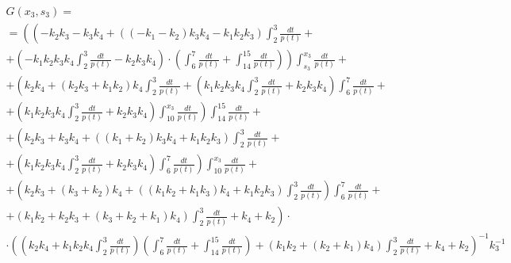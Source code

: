 \documentclass[a4paper,12pt]{article} %
\begin{document}
\begin{multline}
	G(x_3,s_3)=\\=
	\left(
		\left(
			-k_2 k_3-k_3 k_4+\left( \left( -k_1-k_2\right)  k_3 k_4-k_1 k_2 k_3\right)  \int_{2}^{3}\frac{dt}{p(t)}
			\right. \right. + \\ + \left. \left.
			\left( -k_1 k_2 k_3 k_4 \int_{2}^{3}\frac{dt}{p(t)}-k_2 k_3 k_4\right)\cdot
			\left(
				\int_{6}^{7}\frac{dt}{p(t)} + \int_{14}^{15}\frac{dt}{p(t)}
			\right)
		\right)
		\int_{s_3}^{x_3}\frac{dt}{p(t)}
		\right. + \\ + \left.
		\left(
			k_2 k_4+\left( k_2 k_3+k_1 k_2\right)  k_4 \int_{2}^{3}\frac{dt}{p(t)}+
			\left( k_1 k_2 k_3 k_4 \int_{2}^{3}\frac{dt}{p(t)}+k_2 k_3 k_4\right)  \int_{6}^{7}\frac{dt}{p(t)}
			\right. \right. + \\ + \left. \left.
			\left( k_1 k_2 k_3 k_4 \int_{2}^{3}\frac{dt}{p(t)}+k_2 k_3 k_4\right)  \int_{10}^{x_3}\frac{dt}{p(t)}
		\right)
		\int_{14}^{15}\frac{dt}{p(t)}
		\right. + \\ + \left.
		\left( k_2 k_3+k_3 k_4+\left( \left( k_1+k_2\right)  k_3 k_4+k_1 k_2 k_3\right)  \int_{2}^{3}\frac{dt}{p(t)}
		\right. \right. + \\ + \left. \left.
		\left( k_1 k_2 k_3 k_4 \int_{2}^{3}\frac{dt}{p(t)}+k_2 k_3 k_4\right)  \int_{6}^{7}\frac{dt}{p(t)}\right)  \int_{10}^{x_3}\frac{dt}{p(t)}
		\right. + \\ + \left.
		\left( k_2 k_3+\left( k_3+k_2\right)  k_4+\left( \left( k_1 k_2+k_1 k_3\right)  k_4+k_1 k_2 k_3\right)  \int_{2}^{3}\frac{dt}{p(t)}\right)  \int_{6}^{7}\frac{dt}{p(t)}
		\right. + \\ + \left.
		\left( k_1 k_2+k_2 k_3+\left( k_3+k_2+k_1\right)  k_4\right)  \int_{2}^{3}\frac{dt}{p(t)}+k_4+k_2
	\right) \cdot \\ \cdot \left(
		\left( k_2 k_4+k_1 k_2 k_4 \int_{2}^{3}\frac{dt}{p(t)}\right)
		\left( \int_{6}^{7}\frac{dt}{p(t)}+ \int_{14}^{15}\frac{dt}{p(t)} \right)+
		\left( k_1 k_2+\left( k_2+k_1\right)  k_4\right)  \int_{2}^{3}\frac{dt}{p(t)}+k_4+k_2
	\right)^{-1}  k_3^{-1}
\end{multline}
\end{document}
